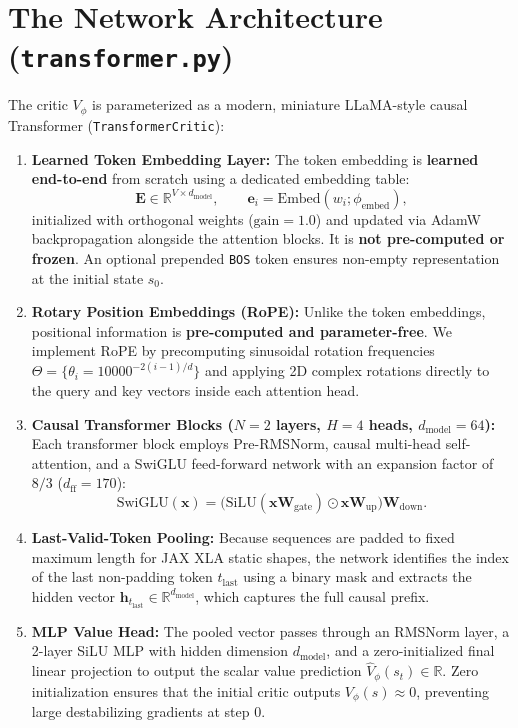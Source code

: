 \documentclass[11pt,a4paper]{article}
\begin{document}
\bigskip

\section{The Network Architecture (\texttt{transformer.py})}

The critic $V_\phi$ is parameterized as a modern, miniature LLaMA-style causal Transformer (\texttt{TransformerCritic}):
\begin{enumerate}[leftmargin=*, itemsep=3pt]
    \item \textbf{Learned Token Embedding Layer:}
    The token embedding is \textbf{learned end-to-end} from scratch using a dedicated embedding table:
    \[
        \mathbf{E} \in \mathbb{R}^{V \times d_{\text{model}}}, \qquad \mathbf{e}_i = \text{Embed}(w_i; \phi_{\text{embed}}),
    \]
    initialized with orthogonal weights ($\text{gain}=1.0$) and updated via AdamW backpropagation alongside the attention blocks. It is \textbf{not pre-computed or frozen}. An optional prepended \texttt{BOS} token ensures non-empty representation at the initial state $s_0$.
    \item \textbf{Rotary Position Embeddings (RoPE):}
    Unlike the token embeddings, positional information is \textbf{pre-computed and parameter-free}. We implement RoPE by precomputing sinusoidal rotation frequencies $\Theta = \{\theta_i = 10000^{-2(i-1)/d}\}$ and applying 2D complex rotations directly to the query and key vectors inside each attention head.
    \item \textbf{Causal Transformer Blocks ($N=2$ layers, $H=4$ heads, $d_{\text{model}}=64$):}
    Each transformer block employs Pre-RMSNorm, causal multi-head self-attention, and a SwiGLU feed-forward network with an expansion factor of $8/3$ ($d_{\text{ff}} = 170$):
    \[
        \text{SwiGLU}(\mathbf{x}) = \big(\text{SiLU}(\mathbf{x}\mathbf{W}_{\text{gate}}) \odot \mathbf{x}\mathbf{W}_{\text{up}}\big)\mathbf{W}_{\text{down}}.
    \]
    \item \textbf{Last-Valid-Token Pooling:}
    Because sequences are padded to fixed maximum length for JAX XLA static shapes, the network identifies the index of the last non-padding token $t_{\text{last}}$ using a binary mask and extracts the hidden vector $\mathbf{h}_{t_{\text{last}}} \in \mathbb{R}^{d_{\text{model}}}$, which captures the full causal prefix.
    \item \textbf{MLP Value Head:}
    The pooled vector passes through an RMSNorm layer, a 2-layer SiLU MLP with hidden dimension $d_{\text{model}}$, and a zero-initialized final linear projection to output the scalar value prediction $\hat{V}_\phi(s_t) \in \mathbb{R}$. Zero initialization ensures that the initial critic outputs $V_\phi(s) \approx 0$, preventing large destabilizing gradients at step 0.
\end{enumerate}
\end{document}
